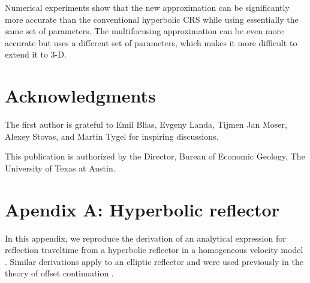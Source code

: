 Numerical experiments show that the new approximation can be
significantly more accurate than the conventional hyperbolic CRS while
using essentially the same set of parameters. The multifocusing
approximation can be even more accurate but uses a different set of
parameters, which makes it more difficult to extend it to 3-D.

\section{Acknowledgments}

The first author is grateful to Emil Blias, Evgeny Landa, Tijmen
Jan Moser, Alexey Stovas, and Martin Tygel for inspiring discussions.

This publication is authorized by the Director, Bureau of Economic
Geology, The University of Texas at Austin.

\appendix
\section{Apendix A: Hyperbolic reflector}

In this appendix, we reproduce the derivation of an analytical
expression for reflection traveltime from a hyperbolic reflector in a
homogeneous velocity model \cite[]{hyper}. Similar derivations apply
to an elliptic reflector and were used previously in the theory of 
offset continuation \cite[]{stovas,GEO68-02-07180732}.

